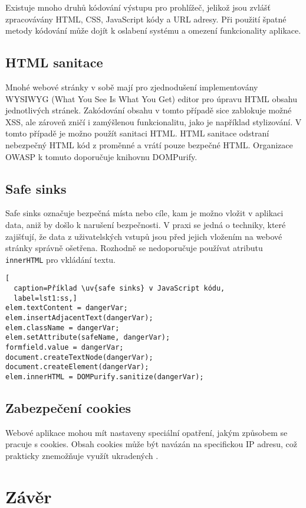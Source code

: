 \documentclass[11pt, conference, a4paper]{IEEEtran}
\begin{document}
Existuje mnoho druhů kódování výstupu pro prohlížeč, jelikož jsou zvlášť zpracovávány HTML, CSS, JavaScript  kódy a URL adresy. Při použití špatné metody kódování může dojít k oslabení systému a omezení funkcionality aplikace. 



\subsection{HTML sanitace} %
Mnohé webové stránky v sobě mají pro zjednodušení implementovány WYSIWYG (What You See Is What You Get) editor pro úpravu HTML obsahu jednotlivých stránek. Zakódování obsahu v tomto případě sice zablokuje možné XSS, ale zároveň zničí i zamýšlenou funkcionalitu, jako je například stylizování. V tomto případě je možno použít sanitaci HTML. HTML sanitace odstraní nebezpečný HTML kód z proměnné a vrátí pouze bezpečné HTML. Organizace OWASP k tomuto doporučuje knihovnu DOMPurify. 


\subsection{Safe sinks}
Safe sinks označuje bezpečná místa nebo cíle, kam je možno vložit v aplikaci data, aniž by došlo k narušení bezpečnosti. V praxi se jedná o techniky, které zajišťují, že data z uživatelských vstupů jsou před jejich vložením na webové stránky správně ošetřena. Rozhodně se nedoporučuje používat atributu \texttt{innerHTML} pro vkládání textu.~\cite{Prevention-XSS-owasp}

\begin{lstlisting}[
  caption=Příklad \uv{safe sinks} v JavaScript kódu,
  label=lst1:ss,]
elem.textContent = dangerVar;
elem.insertAdjacentText(dangerVar);
elem.className = dangerVar;
elem.setAttribute(safeName, dangerVar);
formfield.value = dangerVar;
document.createTextNode(dangerVar);
document.createElement(dangerVar);
elem.innerHTML = DOMPurify.sanitize(dangerVar);
\end{lstlisting}


\subsection{Zabezpečení cookies}
Webové aplikace mohou mít nastaveny speciální opatření, jakým způsobem se pracuje s cookies. Obsah cookies může být navázán na specifickou IP adresu, což prakticky znemožňuje využít ukradených .


\section{Závěr}


\newpage
  
  
\end{document}
